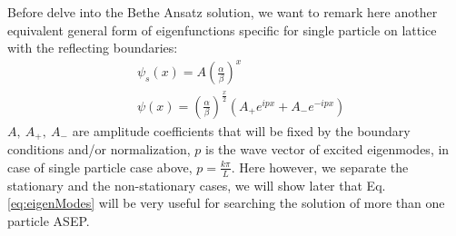 \documentclass[12pt,a4paper]{article}
\begin{document}
Before delve into the Bethe Ansatz solution, we want to remark here another
equivalent general form of eigenfunctions specific for single particle on
lattice with the reflecting boundaries:
\begin{subequations}
    \label{eq:eigenModes}
\begin{eqnarray}
    \label{eq:stationaryEigenMode}
    &\psi_s(x)  =  A\left(\frac{\alpha}{\beta}\right)^x \\
    \label{eq:nonstationaryEigenModes}
    &\psi(x)  =  \left(\frac{\alpha}{\beta}\right)^{\frac{x}{2}}
    \left(A_+ e^{ipx} +  A_-e^{-ipx}\right) 
\end{eqnarray}
\end{subequations}
$A,~A_+,~A_-$ are amplitude coefficients that will be fixed by the
boundary conditions and/or normalization, $p$ is the wave vector of excited
eigenmodes, in case of single particle case above, $p=\frac{k\pi}{L}$.
Here however, we separate the stationary and the non-stationary cases, we will
show later that Eq. \eqref{eq:eigenModes} will be very useful for searching the
solution of more than one particle ASEP.
\end{document}
